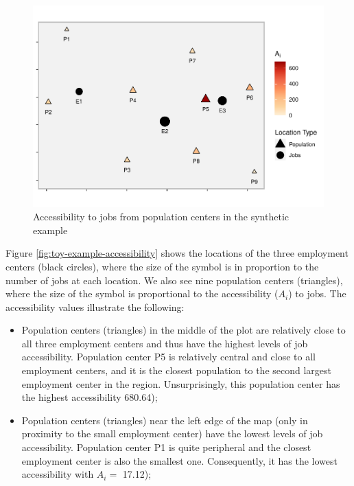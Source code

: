 \documentclass[]{elsarticle} %
\begin{document}
\begin{figure}
\includegraphics[width=1\linewidth]{Spatial-Availability_files/figure-latex/toy-example-accessibility-plot-1} \caption{\label{fig:toy-example-accessibility}Accessibility to jobs from population centers in the synthetic example}\label{fig:toy-example-accessibility-plot}
\end{figure}

Figure \ref{fig:toy-example-accessibility} shows the locations of the
three employment centers (black circles), where the size of the symbol
is in proportion to the number of jobs at each location. We also see
nine population centers (triangles), where the size of the symbol is
proportional to the accessibility (\(A_i\)) to jobs. The accessibility
values illustrate the following:

\begin{itemize}
\item
  Population centers (triangles) in the middle of the plot are
  relatively close to all three employment centers and thus have the
  highest levels of job accessibility. Population center P5 is
  relatively central and close to all employment centers, and it is the
  closest population to the second largest employment center in the
  region. Unsurprisingly, this population center has the highest
  accessibility 680.64);
\item
  Population centers (triangles) near the left edge of the map (only in
  proximity to the small employment center) have the lowest levels of
  job accessibility. Population center P1 is quite peripheral and the
  closest employment center is also the smallest one. Consequently, it
  has the lowest accessibility with \(A_i=\) 17.12);
\end{itemize}
\end{document}
